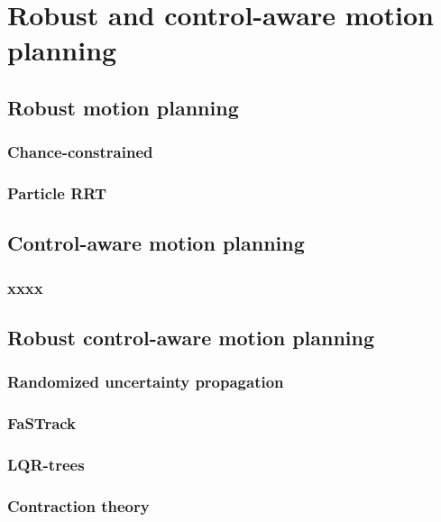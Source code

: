 \section{Robust and control-aware motion planning}
\subsection{Robust motion planning}
\subsubsection{Chance-constrained}
\subsubsection{Particle RRT}
\subsection{Control-aware motion planning}
\subsubsection{xxxx}
\subsection{Robust control-aware motion planning}
\subsubsection{Randomized uncertainty propagation}
\subsubsection{FaSTrack}
\subsubsection{LQR-trees}
\subsubsection{Contraction theory}

\todomarker{}